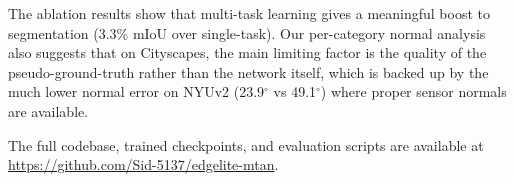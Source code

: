 \documentclass[journal, onecolumn]{IEEEtran}
\begin{document}
The ablation results show that multi-task learning gives a meaningful boost to segmentation (3.3\% mIoU over single-task). Our per-category normal analysis also suggests that on Cityscapes, the main limiting factor is the quality of the pseudo-ground-truth rather than the network itself, which is backed up by the much lower normal error on NYUv2 (23.9$^\circ$ vs 49.1$^\circ$) where proper sensor normals are available.

The full codebase, trained checkpoints, and evaluation scripts are available at \url{https://github.com/Sid-5137/edgelite-mtan}.



\end{document}
